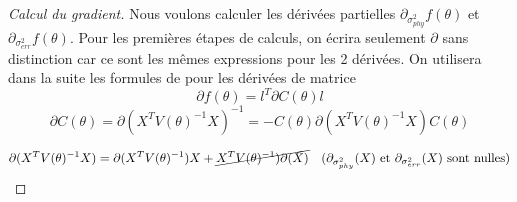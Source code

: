 \documentclass[a4paper, 12pt]{article}\usepackage[]{graphicx}\usepackage[]{xcolor}
\begin{document}
\begin{proof}[Calcul du gradient]
Nous voulons calculer les dérivées partielles $\partial_{\sigma^2_{phy}}f(\theta)$ et $\partial_{\sigma^2_{err}}f(\theta)$. Pour les premières étapes de calculs, on écrira seulement $\partial$ sans distinction car ce sont les mêmes expressions pour les 2 dérivées. 
On utilisera dans la suite les formules de \cite{petersenMatrixCookbook2012} pour les dérivées de matrice
\[
\partial f(\theta)=l^T\partial C(\theta)l
\]
\[
\partial C(\theta)=\partial (X^TV(\theta)^{-1}X)^{-1} = -C(\theta) \partial (X^TV(\theta)^{-1}X)C(\theta)
\]

\[
    \partial (X^TV(\theta)^{-1}X) = \partial (X^TV(\theta)^{-1})X + \cancel{X^TV(\theta)^{-1})\partial(X)} \quad (\partial_{\sigma^2_{phy}}(X)\text{ et } \partial_{\sigma^2_{err}}(X) \text{ sont nulles})
\]



\end{proof}
\end{document}
